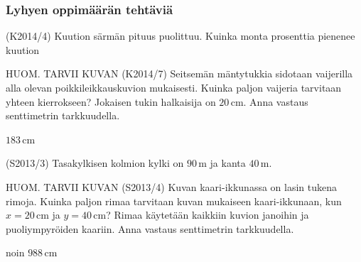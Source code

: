 



\subsubsection*{Lyhyen oppimäärän tehtäviä}


\begin{tehtava}
	(K2014/4) Kuution särmän pituus puolittuu. Kuinka monta prosenttia pienenee kuution
	\begin{alakohdat}
	\end{alakohdat}
						
						\begin{vastaus}
						\begin{alakohdat}
						 \alakohta{$87,5\,\%$}
						 \alakohta{$75\,\%$}
						\end{alakohdat}					  
	\end{vastaus}
	\end{tehtava}

\begin{tehtava}
HUOM. TARVII KUVAN 
(K2014/7) Seitsemän mäntytukkia sidotaan vaijerilla alla olevan poikkileikkauskuvion mukaisesti. Kuinka paljon vaijeria tarvitaan yhteen kierrokseen? Jokaisen tukin halkaisija on $20$\,cm.
Anna vastaus senttimetrin tarkkuudella. 
  \begin{vastaus}
  $183$\,cm
  \end{vastaus}
\end{tehtava}

\begin{tehtava}(S2013/3) Tasakylkisen kolmion kylki on $90$\,m ja kanta $40$\,m.
\begin{alakohdat}
\end{alakohdat}
    \begin{vastaus}
    \begin{alakohdat}
	\alakohta{$26^\circ$}
	\alakohta{$1755$\,$\text{m}^2$}
   \end{alakohdat}
 \end{vastaus}
\end{tehtava}

\begin{tehtava}
HUOM. TARVII KUVAN 
(S2013/4) Kuvan kaari-ikkunassa on lasin tukena rimoja. Kuinka paljon rimaa tarvitaan kuvan mukaiseen kaari-ikkunaan, kun $x=20$\,cm ja $y=40$\,cm? Rimaa käytetään kaikkiin kuvion janoihin ja puoliympyröiden kaariin. Anna vastaus senttimetrin tarkkuudella.
  \begin{vastaus}
  noin $988$\,cm
  \end{vastaus}
\end{tehtava}

